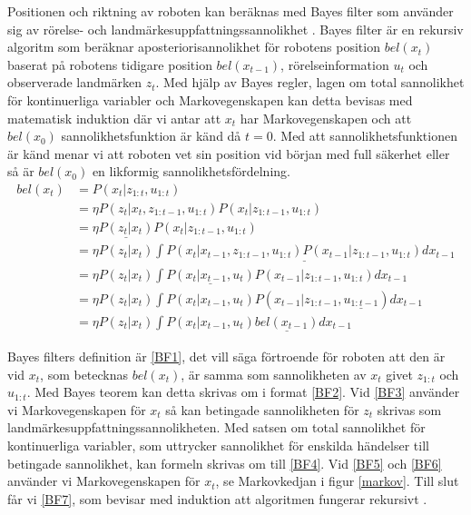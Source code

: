 Positionen och riktning av roboten kan beräknas med Bayes filter som använder sig av rörelse- och landmärkesuppfattningssannolikhet \citep{ProbabilisticRobotics}. Bayes filter är en rekursiv algoritm som beräknar aposteriorisannolikhet för robotens position $bel(x_t)$ baserat på robotens tidigare position $bel(x_{t-1})$, rörelseinformation $u_t$ och observerade landmärken $z_t$. Med hjälp av Bayes regler, lagen om total sannolikhet för kontinuerliga variabler och Markovegenskapen kan detta bevisas med matematisk induktion där vi antar att $x_t$ har Markovegenskapen och att $bel(x_0)$ sannolikhetsfunktion är känd då $t = 0$. Med att sannolikhetsfunktionen är känd menar vi att roboten vet sin position vid början med full säkerhet eller så är $bel(x_0)$ en likformig sannolikhetsfördelning.
\begin{align}
bel(x_t) & = P(x_t | z_{1:t}, u_{1:t}) \tag{BF1}\label{BF1} \\
        & = \eta P(z_t | x_t, z_{1:t-1}, u_{1:t}) P(x_t | z_{1:t-1}, u_{1:t}) \tag{BF2}\label{BF2}\\
        & = \eta \underline{P(z_t | x_t)} P(x_t | z_{1:t-1}, u_{1:t}) \tag{BF3}\label{BF3}\\
        & = \eta P(z_t | x_t) \underline{\int P(x_t | x_{t-1}, z_{1:t-1}, u_{1:t}) P(x_{t-1} | z_{1:t-1}, u_{1:t}) dx_{t-1}} \tag{BF4}\label{BF4}\\
        & = \eta P(z_t | x_t) \int \underline{P(x_t | x_{t-1}, u_t)} P(x_{t-1} | z_{1:t-1}, u_{1:t}) dx_{t-1} \tag{BF5}\label{BF5}\\
        & = \eta P(z_t | x_t) \int P(x_t | x_{t-1}, u_t) P(x_{t-1} | z_{1:t-1}, \underline{u_{1:t-1}}) dx_{t-1} \tag{BF6}\label{BF6}\\
        & = \eta P(z_t | x_t) \int P(x_t | x_{t-1}, u_t) \underline{bel(x_{t-1})} dx_{t-1} \tag{BF7}\label{BF7}
\end{align}

Bayes filters definition är \ref{BF1}, det vill säga förtroende för roboten att den är vid $x_t$, som betecknas $bel(x_t)$, är samma som sannolikheten av $x_t$ givet $z_{1:t}$ och $u_{1:t}$. Med Bayes teorem kan detta skrivas om i format \ref{BF2}. Vid \ref{BF3} använder vi Markovegenskapen för $x_t$ så kan betingade sannolikheten för $z_t$ skrivas som landmärkesuppfattningssannolikheten. Med satsen om total sannolikhet för kontinuerliga variabler, som uttrycker sannolikhet för enskilda händelser till betingade sannolikhet, kan formeln skrivas om till \ref{BF4}. Vid \ref{BF5} och \ref{BF6} använder vi Markovegenskapen för $x_t$, se Markovkedjan i figur \ref{markov}. Till slut får vi \ref{BF7}, som bevisar med induktion att algoritmen fungerar rekursivt \citep{ProbabilisticRobotics}.

